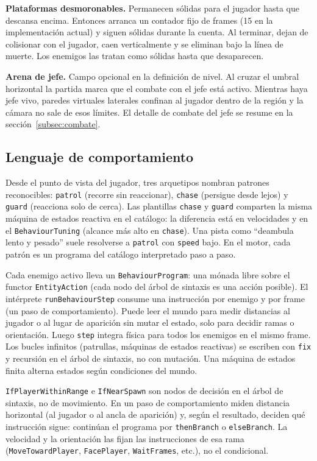\textbf{Plataformas desmoronables.} Permanecen sólidas para el jugador hasta que
descansa encima. Entonces arranca un contador fijo de frames (15 en la
implementación actual) y siguen sólidas durante la cuenta. Al terminar, dejan de
colisionar con el jugador, caen verticalmente y se eliminan bajo la línea de
muerte. Los enemigos las tratan como sólidas hasta que desaparecen.

\textbf{Arena de jefe.} Campo opcional en la definición de nivel. Al cruzar
el umbral horizontal la partida marca que el combate con el jefe está activo. Mientras
haya jefe vivo, paredes virtuales laterales confinan al jugador dentro de la región
y la cámara no sale de esos límites.
El detalle de combate del jefe se resume en la sección~\ref{subsec:combate}.

\subsection{Lenguaje de comportamiento}
\label{subsec:dsl}

Desde el punto de vista del jugador, tres arquetipos nombran patrones
reconocibles: \texttt{patrol} (recorre sin reaccionar), \texttt{chase} (persigue
desde lejos) y \texttt{guard} (reacciona solo de cerca). Las plantillas
\texttt{chase} y \texttt{guard} comparten la misma máquina de estados reactiva en el catálogo: la
diferencia está en velocidades y en el \texttt{BehaviourTuning} (alcance más
alto en \texttt{chase}). Una pista como ``deambula lento y pesado'' suele resolverse a
\texttt{patrol} con \texttt{speed} bajo. En el motor, cada patrón es un programa del
catálogo interpretado paso a paso.

Cada enemigo activo lleva un \texttt{BehaviourProgram}: una mónada libre
sobre el functor \texttt{Entity\-Action} (cada nodo del árbol de sintaxis es una acción
posible). El intérprete \texttt{runBehaviour\-Step} consume una instrucción por
enemigo y por frame (un paso de comportamiento). Puede leer el mundo para
medir distancias al jugador o al lugar de aparición sin mutar
el estado, solo para decidir ramas o orientación. Luego \texttt{step} integra física
para todos los enemigos en el mismo frame. Los bucles infinitos
(patrullas, máquinas de estados reactivas) se escriben con \texttt{fix} y recursión en el
árbol de sintaxis, no con mutación. Una máquina de estados finita alterna
estados según condiciones del mundo.

\texttt{IfPlayerWithinRange} e \texttt{IfNearSpawn} son nodos de decisión en el
árbol de sintaxis, no de movimiento. En un paso de comportamiento miden distancia horizontal
(al jugador o al ancla de aparición) y, según el resultado, deciden qué
instrucción sigue: continúan el programa por \texttt{thenBranch} o
\texttt{elseBranch}. La velocidad y la orientación las fijan las instrucciones de
esa rama (\texttt{MoveTowardPlayer}, \texttt{FacePlayer}, \texttt{WaitFrames},
etc.), no el condicional.

